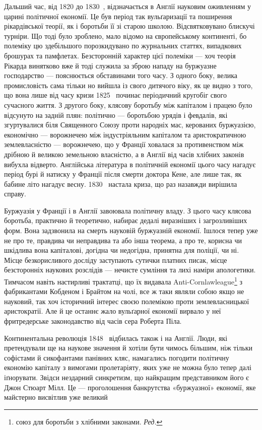 
Дальший час, від 1820 до 1830~, відзначається в Англії науковим
оживленням у царині політичної економії. Це був період
так вульґаризації та поширення рікардівської теорії, як і боротьби
її зі старою школою. Відсвятковувано блискучі турніри.
Що тоді було зроблено, мало відомо на європейському континенті,
бо полеміку цю здебільшого порозкидувано по журнальних
статтях, випадкових брошурах та памфлетах. Безсторонній характер
цієї полеміки — хоч теорія Рікарда винятково вже й тоді
служила за зброю нападу на буржуазне господарство — пояснюється
обставинами того часу. З одного боку, велика промисловість
сама тільки но вийшла із свого дитячого віку, як це видно з того,
що вона лише від часу кризи 1825~ починає періодичний кругобіг
свого сучасного життя. З другого боку, клясову боротьбу між
капіталом і працею було відсунуто на задній плян: політично —
боротьбою урядів і февдалів, які згуртувалися біля Священного
Союзу проти народніх мас, керованих буржуазією, економічно —
ворожнечею між індустріяльним капіталом та аристократичною
землевласністю — ворожнечею, що у Франції ховалася за противенством
між дрібною й великою земельною власністю, а в Англії
від часів хлібних законів вибухла відверто. Англійська література
в політичній економії цього часу нагадує період бурі й натиску
у Франції після смерти доктора Кене, але лише так, як
бабине літо нагадує весну. 1830~ настала криза, що раз назавжди
вирішила справу.

Буржуазія у Франції і в Англії завоювала політичну владу.
З цього часу клясова боротьба, практично й теоретично, набирає
дедалі виразніших і загрозливіших форм. Вона задзвонила
на смерть науковій буржуазній економії. Ішлося тепер уже
не про те, правдива чи неправдива та або інша теорема, а про те,
корисна чи шкідлива вона капіталові, догідна чи недогідна, принятна
для поліції, чи ні. Місце безкорисливого досліду заступають
сутички платних писак, місце безсторонніх наукових розслідів —
нечисте сумління та лихі наміри апологетики. Тимчасом навіть
настирливі трактатці, що їх видавала Anti-Cornlawleague\footnote*{
союз для боротьби з хлібними законами. \emph{Ред.}
} з
фабрикантами Кобденом і Брайтом на чолі, все ж таки являли
собою якщо не науковий, так хоч історичний інтерес своєю полемікою
проти землевласницької аристократії. Але й це останнє
жало вульґарної економії вирвало у неї фритредерське законодавство
від часів сера Роберта Піла.

Континентальна революція 1848~ відбилась також і на Англії.
Люди, які претендували ще на наукове значення й хотіли бути
чимось більшим, ніж тільки софістами й сикофантами панівних
кляс, намагались погодити політичну економію капіталу з вимогами
пролетаріяту, яких уже не можна було тепер далі іґнорувати.
Звідси нездарний синкретизм, що найкращим представником
його є Джон Стюарт Мілл. Це — проголошення банкрутства
«буржуазної» економії, яке майстерно висвітлив уже великий
\parbreak{}  %
